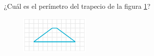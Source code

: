 
\question[25]  ¿Cuál es el perímetro del trapecio de la figura \ref{fig:peri_trap_03}?
\begin{figure}[H]
    \begin{center}
        \includegraphics[width=0.3\textwidth]{../images/peri_trap_03.png}
    \end{center}
    \caption{}
    \label{fig:peri_trap_03}
\end{figure}